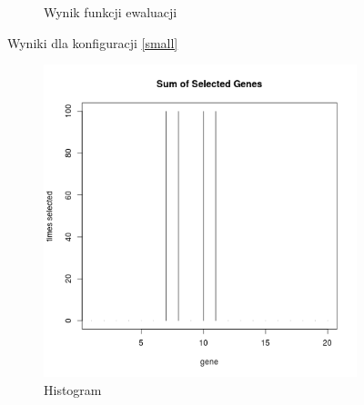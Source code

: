 \documentclass{llncs}
\begin{document}
\begin{figure}[H]
\begin{subfigure}[b]{0.5\textwidth}
                \caption{Wynik funkcji ewaluacji}
                \label{fig:tiger}
        \end{subfigure}
        \caption{Wyniki dla konfiguracji \ref{small}}
        \label{fig:small}
\end{figure}

\begin{figure}[H]
        \centering
        \begin{subfigure}[b]{0.5\textwidth}
                \includegraphics[width=\textwidth]{img/hist}
                \caption{Histogram}
                \label{fig:gull}
        \end{subfigure}%
        ~ %
        \begin{subfigure}[b]{0.5\textwidth}

\end{subfigure}
\end{figure}
\end{document}
